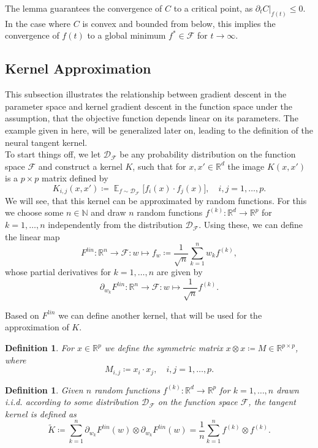 \documentclass[11pt, a4paper]{article}
\newtheorem{definition}[theorem]{Definition}
\newcommand{\N}{\mathds{N}}
\newcommand{\R}{\mathds{R}}
\newcommand{\D}{\mathcal{D}}
\newcommand{\F}{\mathcal{F}}
\DeclareMathOperator*{\E}{\mathds{E}}
\begin{document}
The lemma guarantees the convergence of $C$ to a critical point, as $\partial_tC|_{f(t)} \leq 0$. In the case where $C$ is convex and bounded from below, this implies the convergence of $f(t)$ to a global minimum $f^* \in \F$ for $t \to \infty$.

\subsection{Kernel Approximation} \label{sec:approximation}

This subsection illustrates the relationship between gradient descent in the parameter space and kernel gradient descent in the function space under the assumption, that the objective function depends linear on its parameters. The example given in here, will be generalized later on, leading to the definition of the neural tangent kernel. \\

To start things off, we let $\D_{\F}$ be any probability distribution on the function space $\F$ and construct a kernel $K$, such that for $x,x' \in \R^d$ the image $K(x,x')$ is a $p \times p$ matrix defined by
\[ K_{i,j}(x,x') \coloneq \E_{f \sim \D_{\F}} \Big [ f_i(x) \cdot f_j(x) \Big ], \quad i,j=1,\dots,p. \]
We will see, that this kernel can be approximated by random functions. For this we choose some $n \in \N$ and draw $n$ random functions $f^{(k)} : \R^d \to \R^p$ for $k=1,\dots,n$ independently from the distribution $\D_{\F}$. Using these, we can define the linear map
\[ F^\textit{lin}: \R^n \to \F : w \mapsto f_w \coloneq \frac{1}{\sqrt{n}} \sum_{k=1}^{n}w_kf^{(k)}, \]
whose partial derivatives for $k=1,\dots,n$ are given by
\[ \partial_{w_{k}}F^\textit{lin} : \R^n \to \F: w \mapsto \frac{1}{\sqrt{n}}f^{(k)}. \]

Based on $F^\textit{lin}$ we can define another kernel, that will be used for the approximation of $K$.

\begin{definition}
For $x \in \R^p$ we define the symmetric matrix $x \otimes x \coloneq M \in \R^{p \times p}$, where
\[ M_{i,j} \coloneq x_i \cdot x_j, \quad  i,j=1,\dots,p. \]
\end{definition}

\begin{definition}
Given $n$ random functions $f^{(k)} : \R^d \to \R^p$ for $k=1,\dots,n$ drawn i.i.d. according to some distribution $\D_{\F}$ on the function space $\F$, the tangent kernel is defined as
\[ \tilde{K} \coloneq \sum_{k=1}^{n} \partial_{w_k} F^\textit{lin}(w) \otimes \partial_{w_k} F^\textit{lin}(w) = \frac{1}{n} \sum_{k=1}^{n} f^{(k)} \otimes f^{(k)}. \]
\end{definition}
\end{document}
